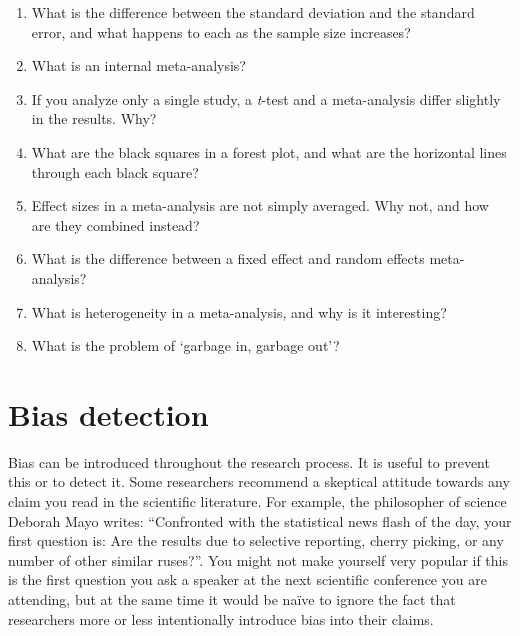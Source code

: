 \documentclass[
  oneside]{krantz}
\begin{document}
\begin{enumerate}
\def\labelenumi{\arabic{enumi}.}
\item
  What is the difference between the standard deviation and the standard error, and what happens to each as the sample size increases?
\item
  What is an internal meta-analysis?
\item
  If you analyze only a single study, a \emph{t}-test and a meta-analysis differ slightly in the results. Why?
\item
  What are the black squares in a forest plot, and what are the horizontal lines through each black square?
\item
  Effect sizes in a meta-analysis are not simply averaged. Why not, and how are they combined instead?
\item
  What is the difference between a fixed effect and random effects meta-analysis?
\item
  What is heterogeneity in a meta-analysis, and why is it interesting?
\item
  What is the problem of `garbage in, garbage out'?
\end{enumerate}

\hypertarget{bias}{%
\chapter{Bias detection}\label{bias}}

Bias can be introduced throughout the research process. It is useful to prevent this or to detect it. Some researchers recommend a skeptical attitude towards any claim you read in the scientific literature. For example, the philosopher of science Deborah Mayo \citeyearpar{mayo_statistical_2018} writes: ``Confronted with the statistical news flash of the day, your first question is: Are the results due to selective reporting, cherry picking, or any number of other similar ruses?''. You might not make yourself very popular if this is the first question you ask a speaker at the next scientific conference you are attending, but at the same time it would be naïve to ignore the fact that researchers more or less intentionally introduce bias into their claims.
\end{document}
